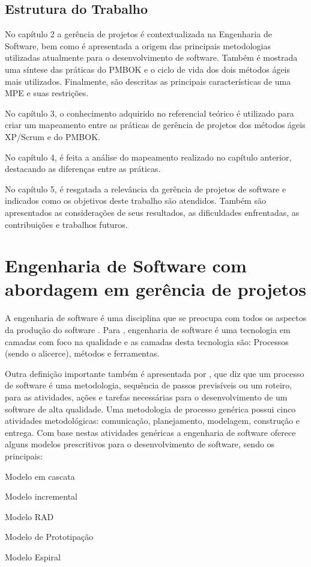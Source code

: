 \documentclass[
    12pt,               %
    openright,          %
    twoside,            %
    a4paper,            %
    chapter=TITLE,     %
    english,            %
    spanish,            %
    portuguese              %
    ]{abntex2}
\begin{document}
\section{Estrutura do Trabalho}
No capítulo 2 a gerência de projetos  é contextualizada na Engenharia de Software, bem como é apresentada a origem das principais metodologias utilizadas atualmente para o desenvolvimento de software. Também é mostrada uma síntese das práticas do PMBOK e o ciclo de vida dos dois métodos ágeis mais utilizados. Finalmente, são descritas as principais características de uma MPE e suas restrições.

No capítulo 3, o conhecimento adquirido no referencial teórico é utilizado para criar um mapeamento entre as práticas de gerência de projetos dos métodos ágeis XP/Scrum e do PMBOK.

No capítulo 4, é feita a análise do mapeamento realizado no capítulo anterior, destacando as diferenças entre as práticas.

No capítulo 5, é resgatada a relevância da gerência de projetos de software e indicados como os objetivos deste trabalho são atendidos. Também são apresentados as considerações de seus resultados, as dificuldades enfrentadas, as contribuições e trabalhos futuros.

\chapter{Engenharia de Software com abordagem em gerência de projetos}
A engenharia de software é uma disciplina que se preocupa com todos os aspectos da produção do software \cite[p.~3]{sommerville2011}. Para , engenharia de software é uma tecnologia em camadas com foco na qualidade e as camadas desta tecnologia são: Processos (sendo o alicerce), métodos e ferramentas.

Outra definição importante também é apresentada por , que diz que um processo de software é uma metodologia, sequência de passos previsíveis ou um roteiro, para as atividades, ações e tarefas necessárias para o desenvolvimento de um software de alta qualidade. Uma metodologia de processo genérica possui cinco atividades metodológicas: comunicação, planejamento, modelagem, construção e entrega. Com base nestas atividades genéricas a engenharia de software oferece alguns modelos prescritivos para o desenvolvimento de software, sendo os principais: 

\begin{alineas}
	\item Modelo em cascata
	\item Modelo incremental
	\item Modelo RAD
	\item Modelo de Prototipação
	\item Modelo Espiral
\end{alineas}
\end{document}
